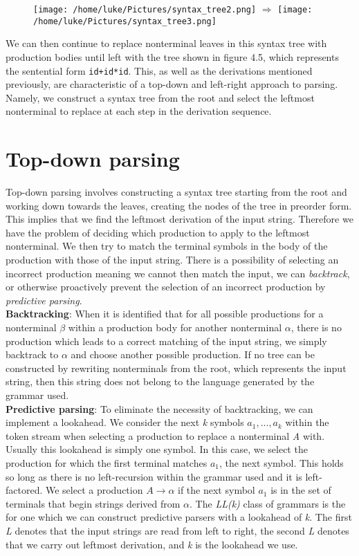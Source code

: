 \documentclass[a4paper, 11pt]{article}
\begin{document}
\begin{figure}[ht!]
	\centering
	\texttt{[image: /home/luke/Pictures/syntax\_tree2.png]}
	$\Rightarrow$
	\texttt{[image: /home/luke/Pictures/syntax\_tree3.png]}
\end{figure}

We can then continue to replace nonterminal leaves in this syntax tree with production bodies until left with the tree shown in figure 4.5, which represents the sentential form \texttt{id+id*id}. This, as well as the derivations mentioned previously, are characteristic of a top-down and left-right approach to parsing. Namely, we construct a syntax tree from the root and select the leftmost nonterminal to replace at each step in the derivation sequence.

\newpage
\section{Top-down parsing}
Top-down parsing involves constructing a syntax tree starting from the root and working down towards the leaves, creating the nodes of the tree in preorder form. This implies that we find the leftmost derivation of the input string. Therefore we have the problem of deciding which production to apply to the leftmost nonterminal. We then try to match the terminal symbols in the body of the production with those of the input string. There is a possibility of selecting an incorrect production meaning we cannot then match the input, we can \textit{backtrack}, or otherwise proactively prevent the selection of an incorrect production by \textit{predictive parsing}.
\\\newline
\textbf{Backtracking}: When it is identified that for all possible productions for a nonterminal $\beta$ within a production body for another nonterminal $\alpha$, there is no production which leads to a correct matching of the input string, we simply backtrack to $\alpha$ and choose another possible production. If no tree can be constructed by rewriting nonterminals from the root, which represents the input string, then this string does not belong to the language generated by the grammar used.
\\\newline
\textbf{Predictive parsing}: To eliminate the necessity of backtracking, we can implement a lookahead. We consider the next \textit{k} symbols $a_1, ..., a_k$ within the token stream when selecting a production to replace a nonterminal \textit{A} with. Usually this lookahead is simply one symbol. In this case, we select the production for which the first terminal matches $a_{1}$, the next symbol. This holds so long as there is no left-recursion within the grammar used and it is left-factored. We select a production $\textit{A}\rightarrow\alpha$ if the next symbol $a_1$ is in the set of terminals that begin strings derived from $\alpha$. The \textit{LL(k)} class of grammars is the for one which we can construct predictive parsers with a lookahead of \textit{k}. The first \textit{L} denotes that the input strings are read from left to right, the second \textit{L} denotes that we carry out leftmost derivation, and \textit{k} is the lookahead we use.
\end{document}

